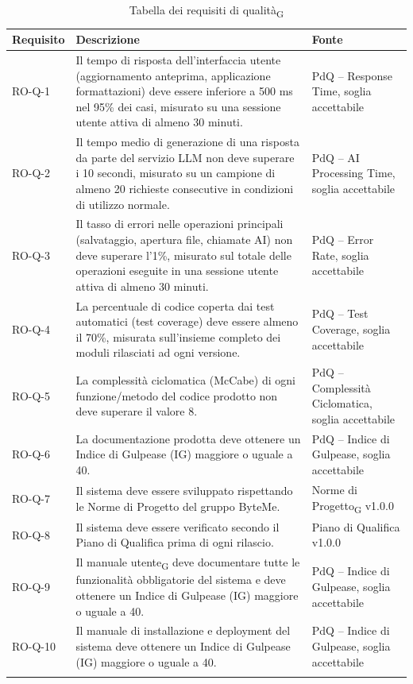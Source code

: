\documentclass[11pt,a4paper]{article}
\newcommand{\gls}[1]{#1\textsubscript{G}}
\begin{document}
\begin{longtable}{|p{}|>{\raggedright\arraybackslash}
  p{}|p{}|}
\hline
\textbf{Requisito} & \textbf{Descrizione} & \textbf{Fonte} \\
\hline
RO-Q-1 & Il tempo di risposta dell'interfaccia utente (aggiornamento anteprima, applicazione formattazioni) deve essere inferiore a 500 ms nel 95\% dei casi, misurato su una sessione utente attiva di almeno 30 minuti.  & PdQ – Response Time, soglia accettabile \\
\hline
RO-Q-2 & Il tempo medio di generazione di una risposta da parte del servizio LLM non deve superare i 10 secondi, misurato su un campione di almeno 20 richieste consecutive in condizioni di utilizzo normale.  & PdQ – AI Processing Time, soglia accettabile \\
\hline
RO-Q-3 & Il tasso di errori nelle operazioni principali (salvataggio, apertura file, chiamate AI) non deve superare l'1\%, misurato sul totale delle operazioni eseguite in una sessione utente attiva di almeno 30 minuti. & PdQ – Error Rate, soglia accettabile \\
\hline
RO-Q-4 & La percentuale di codice coperta dai test automatici (test coverage) deve essere almeno il 70\%, misurata sull'insieme completo dei moduli rilasciati ad ogni versione. & PdQ – Test Coverage, soglia accettabile \\
\hline
RO-Q-5 & La complessità ciclomatica (McCabe) di ogni funzione/metodo del codice prodotto non deve superare il valore 8. & PdQ – Complessità Ciclomatica, soglia accettabile \\
\hline
RO-Q-6 & La documentazione prodotta deve ottenere un Indice di Gulpease (IG) maggiore o uguale a 40. & PdQ – Indice di Gulpease, soglia accettabile \\
\hline
RO-Q-7 & Il sistema deve essere sviluppato rispettando le Norme 
di Progetto del gruppo ByteMe. & \gls{Norme di Progetto} v1.0.0 \\
\hline
RO-Q-8 & Il sistema deve essere verificato secondo il Piano di Qualifica prima di ogni rilascio. & Piano di Qualifica v1.0.0 \\
\hline
RO-Q-9 & Il \gls{manuale utente} deve documentare tutte le funzionalità obbligatorie del sistema e deve ottenere un Indice di Gulpease (IG) maggiore o uguale a 40. & PdQ – Indice di Gulpease, soglia accettabile \\
\hline
RO-Q-10 & Il manuale di installazione e deployment del sistema deve ottenere un Indice di Gulpease (IG) maggiore o uguale a 40. & PdQ – Indice di Gulpease, soglia accettabile \\
\hline
\addlinespace[1em]
\caption{Tabella dei \gls{requisiti di qualità}}
\end{longtable}
\end{document}
